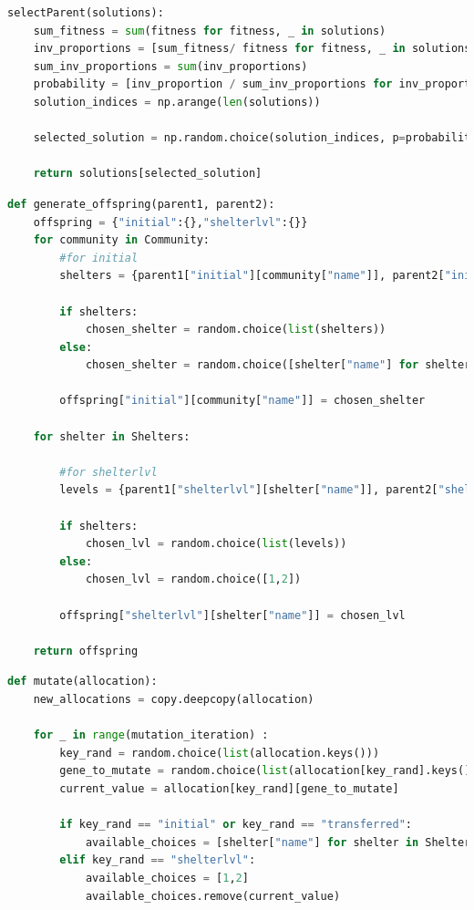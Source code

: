 \begin{appendices}
\begin{centerappendixtitle}
\begin{lstlisting}[language=Python,caption={Genetic Algorithm - Selection}, label={selectionCode}]
selectParent(solutions):
	sum_fitness = sum(fitness for fitness, _ in solutions)
	inv_proportions = [sum_fitness/ fitness for fitness, _ in solutions]
	sum_inv_proportions = sum(inv_proportions)
	probability = [inv_proportion / sum_inv_proportions for inv_proportion in inv_proportions]
	solution_indices = np.arange(len(solutions))
	
	selected_solution = np.random.choice(solution_indices, p=probability)
	
	return solutions[selected_solution]
\end{lstlisting}

\begin{lstlisting}[language=Python,caption={Genetic Algorithm - Crossover}, label={crossoverCode}]
def generate_offspring(parent1, parent2):
    offspring = {"initial":{},"shelterlvl":{}}
    for community in Community:
        #for initial
        shelters = {parent1["initial"][community["name"]], parent2["initial"][community["name"]]} 
        
        if shelters:
            chosen_shelter = random.choice(list(shelters))
        else:
            chosen_shelter = random.choice([shelter["name"] for shelter in Shelters])

        offspring["initial"][community["name"]] = chosen_shelter

    for shelter in Shelters:

        #for shelterlvl
        levels = {parent1["shelterlvl"][shelter["name"]], parent2["shelterlvl"][shelter["name"]]} 
        
        if shelters:
            chosen_lvl = random.choice(list(levels))
        else:
            chosen_lvl = random.choice([1,2])

        offspring["shelterlvl"][shelter["name"]] = chosen_lvl

    return offspring
\end{lstlisting}

\pagebreak
\begin{lstlisting}[language=Python,caption={Genetic Algorithm - Mutation}, label={mutationCode}]
def mutate(allocation):
    new_allocations = copy.deepcopy(allocation)

    for _ in range(mutation_iteration) : 
        key_rand = random.choice(list(allocation.keys()))
        gene_to_mutate = random.choice(list(allocation[key_rand].keys()))
        current_value = allocation[key_rand][gene_to_mutate]
        
        if key_rand == "initial" or key_rand == "transferred":
            available_choices = [shelter["name"] for shelter in Shelters if shelter["name"] != current_value]
        elif key_rand == "shelterlvl":
            available_choices = [1,2]
            available_choices.remove(current_value)


\end{lstlisting}
\end{centerappendixtitle}
\end{appendices}
